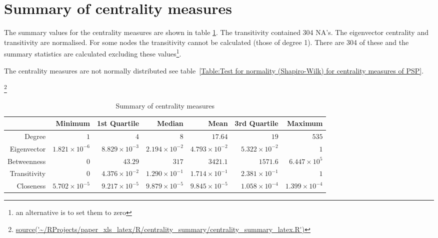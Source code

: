 \section{Summary of centrality measures}

The summary values for the centrality measures are shown in table \ref{Table:Summary of centrality measures}. The transitivity contained 304 NA's.
The eigenvector centrality and transitivity are normalised. For some nodes the transitivity cannot be calculated (those of degree 1). There are 304 of these and the summary statistics are calculated excluding these values\footnote{an alternative is to set them to zero}. 

The centrality measures are not normally distributed see table~\ref{Table:Test for normality (Shapiro-Wilk) for centrality measures of PSP}.


\footnote{\url{source('~/RProjects/paper_xls_latex/R/centrality_summary/centrality_summary_latex.R')}}
\begin{table}[ht]
\centering
\begin{tabular}{rrrrrrr}
  \hline
 & Minimum & 1st Quartile & Median & Mean & 3rd Quartile & Maximum \\ 
  \hline
Degree & $1 $ & $4 $ & $8 $ & $17.64$  & $19$ & $535$ \\ 
  Eigenvector & $1.821 \times 10^{-6}$ & $8.829 \times 10^{-3}$ & $2.194 \times 10^{-2}$ & $4.793 \times 10^{-2}$ & $5.322 \times 10^{-2}$ & $1 $ \\ 
  Betweenness & $0 $ & $43.29 $ & $317 $ & $3421.1$ & $1571.6$& $6.447 \times 10^{5}$ \\ 
  Transitivity & $0 $ & $4.376 \times 10^{-2}$ & $1.290 \times 10^{-1}$ & $1.714 \times 10^{-1}$ & $2.381 \times 10^{-1}$ & $1 $ \\ 
  Closeness & $5.702 \times 10^{-5}$ & $9.217 \times 10^{-5}$ & $9.879 \times 10^{-5}$ & $9.845 \times 10^{-5}$ & $1.058 \times 10^{-4}$ & $1.399 \times 10^{-4}$ \\ 
   \hline
\end{tabular}
\caption{Summary of centrality measures} 
\label{Table:Summary of centrality measures}
\end{table}


